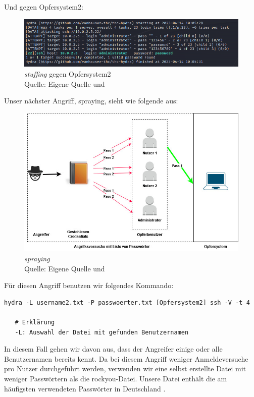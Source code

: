 Und gegen Opfersystem2:
\begin{figure}[H]
   \centering
   \includegraphics[width=1\textwidth]{assets/stuffing_kali2.png}
   \caption{\textit{\gls{stuffing}} gegen Opfersystem2\\Quelle: Eigene Quelle und \citep{Nguyen_stuffing}}
   \centering
\end{figure}

\newpage
Unser nächster Angriff, \gls{spraying}, sieht wie folgende aus:
\begin{figure}[H]
   \centering
   \includegraphics[width=1\textwidth]{assets/Spraying.jpg}
   \caption{\textit{\gls{spraying}}\\Quelle: Eigene Quelle und \citep{Swathi_spraxy}}
   \centering
\end{figure}

Für diesen Angriff benutzen wir folgendes Kommando:
{
\begin{Verbatim}[frame=single]
   hydra -L username2.txt -P passwoerter.txt [Opfersystem2] ssh -V -t 4

   # Erklärung
   -L: Auswahl der Datei mit gefunden Benutzernamen
\end{Verbatim}
}

In diesem Fall gehen wir davon aus, dass der Angreifer einige oder alle Benutzernamen bereits kennt. Da bei diesem Angriff weniger Anmeldeversuche pro Nutzer durchgeführt werden, verwenden wir eine selbst erstellte Datei mit weniger Passwörtern als die \gls{rockyou}-Datei. Unsere Datei enthält die am häufigsten verwendeten Passwörter in Deutschland \citep{silicon_passwort}.

